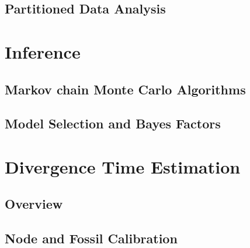 \documentclass[11pt]{book}
\begin{document}
\chapter{Partitioned Data Analysis}
\def \ResourcePath {RB_Partition_Tutorial/}






\part{Inference}

\chapter{Markov chain Monte Carlo Algorithms}
\def \ResourcePath {RB_MCMC_Tutorial/}


\chapter{Model Selection and Bayes Factors}
\def \ResourcePath {RB_BayesFactor_Tutorial/}






\part{Divergence Time Estimation}

%

\chapter{Overview}
\def \ResourcePath {RB_DivergenceTime_Tutorial/}


\chapter{Node and Fossil Calibration}
\def \ResourcePath {RB_DivergenceTime_Calibration_Tutorial/}

\end{document}
